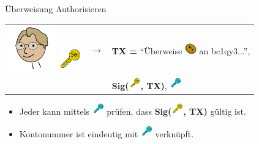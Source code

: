 \documentclass[aspectratio=169]{beamer}
\begin{document}
\begin{frame}{Überweisung Authorisieren}
    \begin{center}
        \begin{tabular}{ccl}
            \includegraphics[width=2cm]{../icons/Linus} \hspace*{-0.5cm} \includegraphics[width=1cm]{../icons/SecKey} & {\Huge$\longrightarrow$} & \textbf{TX =} ``Überweise \includegraphics[width=0.5cm]{../icons/Coin} an bc1qy3...'',\\
            & & \textbf{Sig(\includegraphics[width=0.5cm]{../icons/SecKey}, TX)}, \includegraphics[width=0.5cm]{../icons/PubKey}\\
        \end{tabular}
    \end{center}
    \vspace{1cm}
    \begin{itemize}
        \item Jeder kann mittels \includegraphics[width=0.5cm]{../icons/PubKey} prüfen, dass \textbf{Sig(\includegraphics[width=0.5cm]{../icons/SecKey}, TX)} gültig ist.
        \item Kontonummer ist eindeutig mit \includegraphics[width=0.5cm]{../icons/PubKey} verknüpft.
    \end{itemize}
\end{frame}
\end{document}
